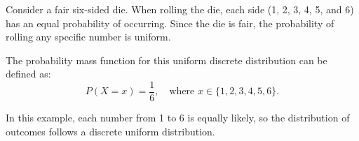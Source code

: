 \documentclass{article}
\begin{document}
Consider a fair six-sided die. When rolling the die, each side (1, 2, 3, 4, 5, and 6) has an equal probability of occurring. Since the die is fair, the probability of rolling any specific number is uniform. 

The probability mass function for this uniform discrete distribution can be defined as:
\[
P(X = x) = \frac{1}{6}, \quad \text{where } x \in \{1, 2, 3, 4, 5, 6\}.
\]

In this example, each number from 1 to 6 is equally likely, so the distribution of outcomes follows a discrete uniform distribution.
\end{document}
